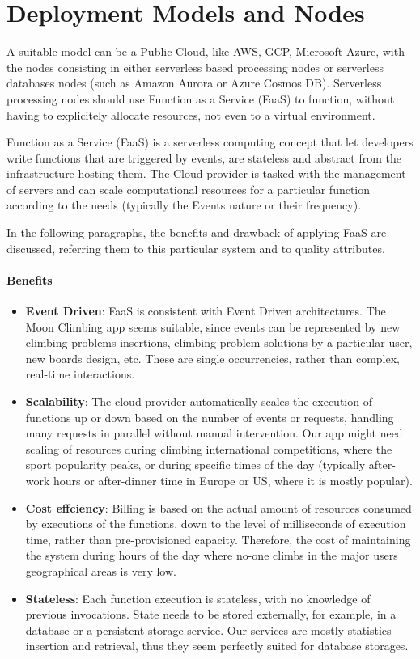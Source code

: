 \documentclass{article}
\begin{document}
\section{Deployment Models and Nodes}\label{sec:models}

A suitable model can be a Public Cloud, like AWS, GCP, Microsoft Azure, with the nodes consisting in either serverless based processing nodes or serverless databases nodes (such as Amazon Aurora or Azure Cosmos DB). 
Serverless processing nodes should use Function as a Service (FaaS) to function, without having to explicitely allocate resources, not even to a virtual environment.

Function as a Service (FaaS) is a serverless computing concept that let developers write functions that are triggered by events, are stateless and abstract from the infrastructure hosting them. The Cloud provider is tasked with the management of servers and can scale computational resources for a particular function according to the needs (typically the Events nature or their frequency).

In the following paragraphs, the benefits and drawback of applying FaaS are discussed, referring them to this particular system and to quality attributes.

\paragraph*{Benefits}%
\begin{itemize}
    \item \textbf{Event Driven}: FaaS is consistent with Event Driven architectures. The Moon Climbing app seems suitable, since events can be represented by new climbing problems insertions, climbing problem solutions by a particular user, new boards design, etc. These are single occurrencies, rather than complex, real-time interactions.
    \item \textbf{Scalability}: The cloud provider automatically scales the execution of functions up or down based on the number of events or requests, handling many requests in parallel without manual intervention. Our app might need scaling of resources during climbing international competitions, where the sport popularity peaks, or during specific times of the day (typically after-work hours or after-dinner time in Europe or US, where it is mostly popular).
    \item \textbf{Cost effciency}: Billing is based on the actual amount of resources consumed by executions of the functions, down to the level of milliseconds of execution time, rather than pre-provisioned capacity. Therefore, the cost of maintaining the system during hours of the day where no-one climbs in the major users geographical areas is very low.
    \item \textbf{Stateless}: Each function execution is stateless, with no knowledge of previous invocations. State needs to be stored externally, for example, in a database or a persistent storage service. Our services are mostly statistics insertion and retrieval, thus they seem perfectly suited for database storages.
\end{itemize}
\end{document}
